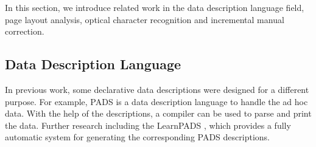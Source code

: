 In this section, we introduce related 
work in the data description language field, page layout analysis, 
optical character recognition and incremental manual correction. 

\subsection{Data Description Language}
In previous work, some declarative data 
descriptions were designed for a different purpose. For example, 
PADS \cite{fisher+:pads} is a data description language to 
handle the ad hoc data. 
With the help of the descriptions, a compiler can be 
used to parse and print the data. Further research including 
the LearnPADS \cite{Fisher:2008:DSF,fisher2008learnpads}, 
which provides a fully automatic 
system for generating the corresponding PADS descriptions. 

